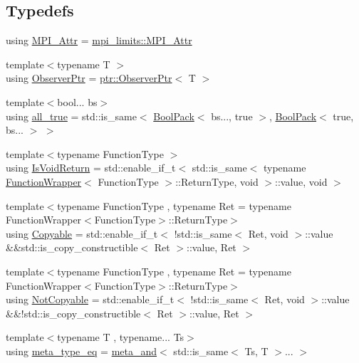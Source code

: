 \subsection*{Typedefs}
\begin{DoxyCompactItemize}
\item 
using \hyperlink{namespacevt_1_1util_acdef825f3bbbffb020925d3ba6151df9}{M\+P\+I\+\_\+\+Attr} = \hyperlink{structvt_1_1util_1_1mpi__limits_1_1_m_p_i___attr}{mpi\+\_\+limits\+::\+M\+P\+I\+\_\+\+Attr}
\item 
{\footnotesize template$<$typename T $>$ }\\using \hyperlink{namespacevt_1_1util_a7d480434049896696b9a50c38a766202}{Observer\+Ptr} = \hyperlink{structvt_1_1util_1_1ptr_1_1_observer_ptr}{ptr\+::\+Observer\+Ptr}$<$ T $>$
\item 
{\footnotesize template$<$bool... bs$>$ }\\using \hyperlink{namespacevt_1_1util_a3169b1fa334a1e8fa2326b8db648e446}{all\+\_\+true} = std\+::is\+\_\+same$<$ \hyperlink{structvt_1_1util_1_1_bool_pack}{Bool\+Pack}$<$ bs..., true $>$, \hyperlink{structvt_1_1util_1_1_bool_pack}{Bool\+Pack}$<$ true, bs... $>$ $>$
\item 
{\footnotesize template$<$typename Function\+Type $>$ }\\using \hyperlink{namespacevt_1_1util_a97df3e28837417537b3bc035c74f064d}{Is\+Void\+Return} = std\+::enable\+\_\+if\+\_\+t$<$ std\+::is\+\_\+same$<$ typename \hyperlink{structvt_1_1util_1_1_function_wrapper}{Function\+Wrapper}$<$ Function\+Type $>$\+::Return\+Type, void $>$\+::value, void $>$
\item 
{\footnotesize template$<$typename Function\+Type , typename Ret  = typename Function\+Wrapper$<$\+Function\+Type$>$\+::\+Return\+Type$>$ }\\using \hyperlink{namespacevt_1_1util_ae9a553985cdc8e9bd4e55f55161f2929}{Copyable} = std\+::enable\+\_\+if\+\_\+t$<$ !std\+::is\+\_\+same$<$ Ret, void $>$\+::value \&\&std\+::is\+\_\+copy\+\_\+constructible$<$ Ret $>$\+::value, Ret $>$
\item 
{\footnotesize template$<$typename Function\+Type , typename Ret  = typename Function\+Wrapper$<$\+Function\+Type$>$\+::\+Return\+Type$>$ }\\using \hyperlink{namespacevt_1_1util_a0760a3963341a602dfe2dfc42d78c867}{Not\+Copyable} = std\+::enable\+\_\+if\+\_\+t$<$ !std\+::is\+\_\+same$<$ Ret, void $>$\+::value \&\&!std\+::is\+\_\+copy\+\_\+constructible$<$ Ret $>$\+::value, Ret $>$
\item 
{\footnotesize template$<$typename T , typename... Ts$>$ }\\using \hyperlink{namespacevt_1_1util_aaa76da2983f12be56a31a96c017e8dd1}{meta\+\_\+type\+\_\+eq} = \hyperlink{structvt_1_1util_1_1meta__and}{meta\+\_\+and}$<$ std\+::is\+\_\+same$<$ Ts, T $>$... $>$
\end{DoxyCompactItemize}


